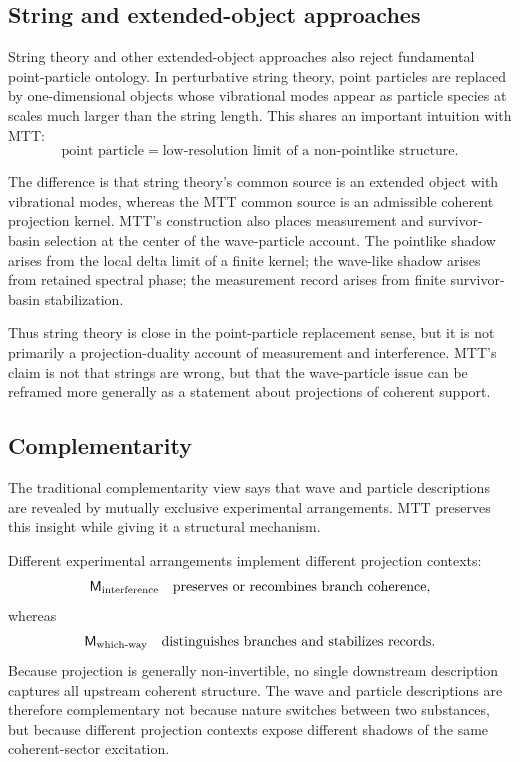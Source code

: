 \documentclass[11pt]{article}
\newcommand{\Meas}{\mathsf M}
\begin{document}
\subsection{String and extended-object approaches}
\label{subsec:relation-string}

String theory and other extended-object approaches also reject fundamental point-particle
ontology. In perturbative string theory, point particles are replaced by one-dimensional
objects whose vibrational modes appear as particle species at scales much larger than the
string length. This shares an important intuition with MTT:
\begin{equation}
  \text{point particle}
  =
  \text{low-resolution limit of a non-pointlike structure}.
\end{equation}

The difference is that string theory's common source is an extended object with vibrational
modes, whereas the MTT common source is an admissible coherent projection kernel. MTT's
construction also places measurement and survivor-basin selection at the center of the
wave-particle account. The pointlike shadow arises from the local delta limit of a finite kernel;
the wave-like shadow arises from retained spectral phase; the measurement record arises from
finite survivor-basin stabilization.

Thus string theory is close in the point-particle replacement sense, but it is not primarily a
projection-duality account of measurement and interference. MTT's claim is not that strings
are wrong, but that the wave-particle issue can be reframed more generally as a statement
about projections of coherent support.

\subsection{Complementarity}
\label{subsec:relation-complementarity-existing}

The traditional complementarity view says that wave and particle descriptions are revealed
by mutually exclusive experimental arrangements. MTT preserves this insight while giving it
a structural mechanism.

Different experimental arrangements implement different projection contexts:
\begin{equation}
  \Meas_{\rm interference}
  \quad\text{preserves or recombines branch coherence},
\end{equation}
whereas
\begin{equation}
  \Meas_{\rm which\text{-}way}
  \quad\text{distinguishes branches and stabilizes records}.
\end{equation}
Because projection is generally non-invertible, no single downstream description captures all
upstream coherent structure. The wave and particle descriptions are therefore complementary
not because nature switches between two substances, but because different projection contexts
expose different shadows of the same coherent-sector excitation.
\end{document}
